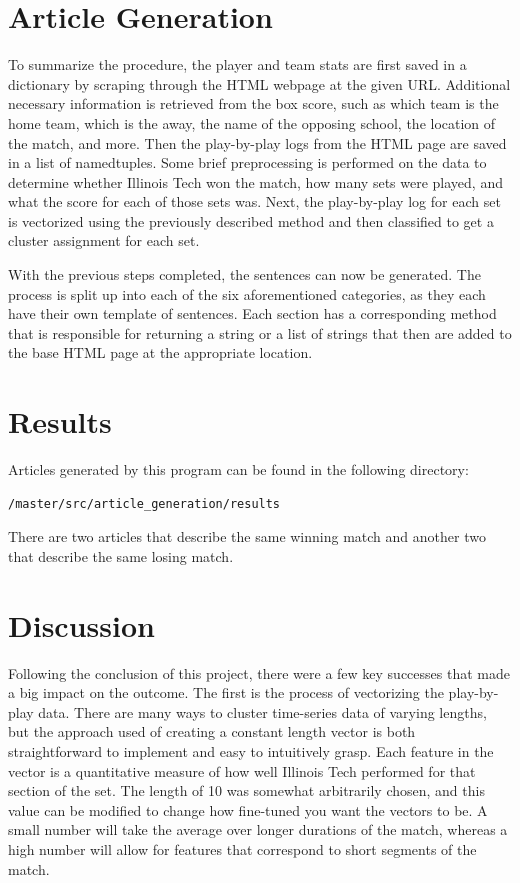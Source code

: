 \documentclass{article}
\begin{document}
\section{Article Generation}
To summarize the procedure, the player and team stats are first saved in a dictionary by scraping through the HTML webpage at the given URL. Additional necessary information is retrieved from the box score, such as which team is the home team, which is the away, the name of the opposing school, the location of the match, and more. Then the play-by-play logs from the HTML page are saved in a list of namedtuples.  Some brief preprocessing is performed on the data to determine whether Illinois Tech won the match, how many sets were played, and what the score for each of those sets was. Next, the play-by-play log for each set is vectorized using the previously described method and then classified to get a cluster assignment for each set. 

With the previous steps completed, the sentences can now be generated. The process is split up into each of the six aforementioned categories, as they each have their own template of sentences. Each section has a corresponding method that is responsible for returning a string or a list of strings that then are added to the base HTML page at the appropriate location.  

\section{Results}
Articles generated by this program can be found in the following directory:
\begin{verbatim}
/master/src/article_generation/results
\end{verbatim}

There are two articles that describe the same winning match and another two that describe the same losing match.

\section{Discussion}

Following the conclusion of this project, there were a few key successes that made a big impact on the outcome. The first is the process of vectorizing the play-by-play data. There are many ways to cluster time-series data of varying lengths, but the approach used of creating a constant length vector is both straightforward to implement and easy to intuitively grasp. Each feature in the vector is a quantitative measure of how well Illinois Tech performed for that section of the set. The length of 10 was somewhat arbitrarily chosen, and this value can be modified to change how fine-tuned you want the vectors to be. A small number will take the average over longer durations of the match, whereas a high number will allow for features that correspond to short segments of the match. 
\end{document}
